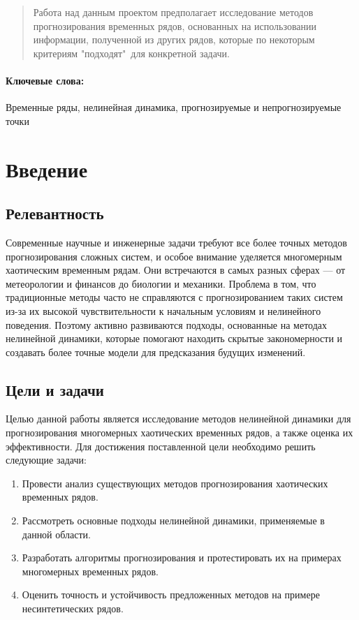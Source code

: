 \documentclass[a4paper, 12pt]{extarticle}
\begin{document}
\newpage
\begin{abstract}
Работа над данным проектом предполагает исследование методов прогнозирования временных рядов, основанных на использовании информации, полученной из других рядов, которые по некоторым критериям "подходят"\ для конкретной задачи.
\end{abstract}

\paragraph*{Ключевые слова:}
Временные ряды, нелинейная динамика, прогнозируемые и непрогнозируемые точки

\section{Введение}

\subsection{Релевантность}
Современные научные и инженерные задачи требуют все более точных методов прогнозирования сложных систем, и особое внимание уделяется многомерным хаотическим временным рядам. Они встречаются в самых разных сферах — от метеорологии и финансов до биологии и механики. Проблема в том, что традиционные методы часто не справляются с прогнозированием таких систем из-за их высокой чувствительности к начальным условиям и нелинейного поведения. Поэтому активно развиваются подходы, основанные на методах нелинейной динамики, которые помогают находить скрытые закономерности и создавать более точные модели для предсказания будущих изменений.

\subsection{Цели и задачи}
Целью данной работы является исследование методов нелинейной динамики для прогнозирования многомерных хаотических временных рядов, а также оценка их эффективности.
Для достижения поставленной цели необходимо решить следующие задачи:
\begin{enumerate}

\item Провести анализ существующих методов прогнозирования хаотических временных рядов.

\item Рассмотреть основные подходы нелинейной динамики, применяемые в данной области.

\item Разработать алгоритмы прогнозирования и протестировать их на примерах многомерных временных рядов.

\item Оценить точность и устойчивость предложенных методов на примере несинтетических рядов.

\end{enumerate}
\end{document}
